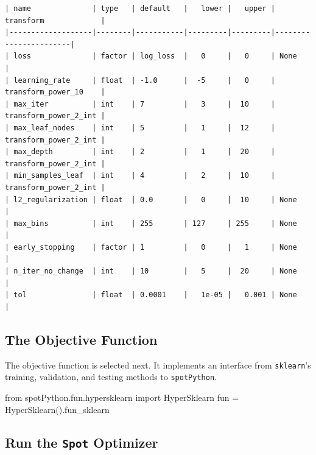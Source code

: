 \documentclass[
  letterpaper,
  DIV=11,
  numbers=noendperiod]{scrreprt}
\newenvironment{Shaded}{\begin{snugshade}}{\end{snugshade}}
\newcommand{\ImportTok}[1]{\textcolor[rgb]{0.00,0.46,0.62}{#1}}
\newcommand{\NormalTok}[1]{\textcolor[rgb]{0.00,0.23,0.31}{#1}}
\newcommand{\OperatorTok}[1]{\textcolor[rgb]{0.37,0.37,0.37}{#1}}
\begin{document}
\begin{verbatim}
| name              | type   | default   |   lower |   upper | transform             |
|-------------------|--------|-----------|---------|---------|-----------------------|
| loss              | factor | log_loss  |   0     |   0     | None                  |
| learning_rate     | float  | -1.0      |  -5     |   0     | transform_power_10    |
| max_iter          | int    | 7         |   3     |  10     | transform_power_2_int |
| max_leaf_nodes    | int    | 5         |   1     |  12     | transform_power_2_int |
| max_depth         | int    | 2         |   1     |  20     | transform_power_2_int |
| min_samples_leaf  | int    | 4         |   2     |  10     | transform_power_2_int |
| l2_regularization | float  | 0.0       |   0     |  10     | None                  |
| max_bins          | int    | 255       | 127     | 255     | None                  |
| early_stopping    | factor | 1         |   0     |   1     | None                  |
| n_iter_no_change  | int    | 10        |   5     |  20     | None                  |
| tol               | float  | 0.0001    |   1e-05 |   0.001 | None                  |
\end{verbatim}

\hypertarget{sec-the-objective-function-17}{%
\subsection{The Objective
Function}\label{sec-the-objective-function-17}}

The objective function is selected next. It implements an interface from
\texttt{sklearn}'s training, validation, and testing methods to
\texttt{spotPython}.

\begin{Shaded}
\begin{Highlighting}[]
\ImportTok{from}\NormalTok{ spotPython.fun.hypersklearn }\ImportTok{import}\NormalTok{ HyperSklearn}
\NormalTok{fun }\OperatorTok{=}\NormalTok{ HyperSklearn().fun\_sklearn}
\end{Highlighting}
\end{Shaded}

\hypertarget{run-the-spot-optimizer-3}{%
\subsection{\texorpdfstring{Run the \texttt{Spot}
Optimizer}{Run the Spot Optimizer}}\label{run-the-spot-optimizer-3}}
\end{document}
